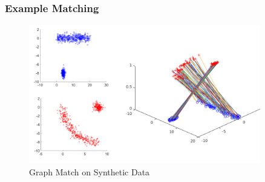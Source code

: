 \documentclass{beamer}
\begin{document}
\begin{frame}
  \frametitle{Example Matching}
  \begin{figure}
    \centering
    \includegraphics[width = 0.9\textwidth]{./Images/GraphMatch/CombinePic/combinepic.png}
    \caption{Graph Match on Synthetic Data}
  \end{figure}
\end{frame}

\end{document}
